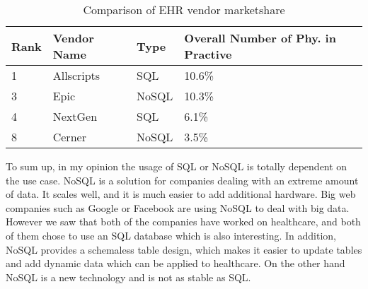 \documentclass{article}
\begin{document}
\begin{table}[h]
\centering
\begin{tabular}{| l | l | l | l |}
\hline
Rank 			&	Vendor Name 	&	Type		& 	Overall Number of Phy. in Practive  \\
\hline
\hline
1				&	Allscripts		&	SQL			&	10.6\%								\\
\hline 
3				&	Epic			&	NoSQL		&	10.3\%								\\
\hline 
4				&	NextGen			&	SQL			&	6.1\%								\\
\hline 
8				&	Cerner			&	NoSQL		&	3.5\%								\\
\hline 
\end{tabular}
	\caption{Comparison of EHR vendor marketshare\protect\cite{online23}}
	\label{tab:marketshare}
\end{table}

To sum up, in my opinion the usage of SQL or NoSQL is totally dependent on the use case. NoSQL is a solution for companies dealing with an extreme amount of data. It scales well, and it is much easier to add additional hardware. Big web companies such as Google or Facebook are using NoSQL to deal with big data. However we saw that both of the companies have worked on healthcare, and both of them chose to use an SQL database which is also interesting. In addition, NoSQL provides a schemaless table design, which makes it easier to update tables and add dynamic data which can be applied to healthcare. On the other hand NoSQL is a new technology and is not as stable as SQL.


\end{document}

